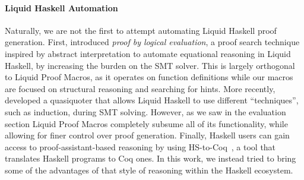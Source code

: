 \paragraph{Liquid Haskell Automation}
Naturally, we are not the first to attempt automating Liquid Haskell
proof generation.  First, \citet{VazouTCSNWJ18} introduced {\em proof
  by logical evaluation}, a proof search technique inspired by
abstract interpretation to automate equational reasoning in Liquid
Haskell, by increasing the burden on the SMT solver. This is largely
orthogonal to Liquid Proof Macros, as it operates on function
definitions while our macros are focused on structural reasoning and
searching for hints. More recently, \citet{TacticThesis} developed a
quasiquoter that allows Liquid Haskell to use different ``techniques'',
such as induction, during SMT solving. However, as we saw in the evaluation
section Liquid Proof Macros completely subsume all of its functionality,
while allowing for finer control over proof generation.
%
Finally, Haskell users can gain access to proof-assistant-based
reasoning by using HS-to-Coq~\cite{BreitnerSLRWCW21}, a tool that
translates Haskell programs to Coq ones. In this work, we instead
tried to bring some of the advantages of that style of reasoning
within the Haskell ecosystem.



%  


